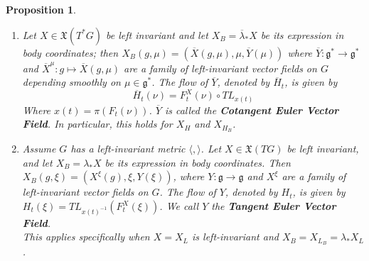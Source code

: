 \documentclass{article}
\newtheorem{prop}{Proposition}
\begin{document}
\begin{prop}

\begin{enumerate}
    \item Let $X \in \mathfrak{X}(T^*G)$ be left invariant and let $X_B = \overline{\lambda}_* X$ be its expression in body coordinates; then $X_B (g,\mu) = (\overline{X}(g,\mu), \mu, \overline{Y}(\mu))$ where $\overline{Y}: \mathfrak{g}^* \to \mathfrak{g}^*$ and $\overline{X}^{\mu}: g \mapsto \overline{X}(g,\mu)$ are a family of left-invariant vector fields on $G$ depending smoothly on $\mu \in \mathfrak{g}^*$. The flow of $\overline{Y}$, denoted by $\overline{H}_t$, is given by \begin{equation} \overline{H}_t(\nu) = F^X_t(\nu) \circ TL_{x(t)} \end{equation}
    Where $x(t) = \pi(F_t(\nu))$. $\overline{Y}$ is called the \textbf{Cotangent Euler Vector Field}. In particular, this holds for $X_H$ and $X_{H_B}$.
    
    \item Assume $G$ has a left-invariant metric $\langle , \rangle$. Let $X \in \mathfrak{X}(TG)$ be left invariant, and let $X_B=\lambda_* X$ be its expression in body coordinates. Then $X_B(g,\xi) = (X^{\xi}(g), \xi, Y(\xi))$, where $Y:\mathfrak{g} \to \mathfrak{g}$ and $X^{\xi}$ are a family of left-invariant vector fields on $G$. The flow of $Y$, denoted by $H_t$, is given by $H_t(\xi) = TL_{x(t)^{-1}}(F^X_t(\xi))$. We call $Y$ the \textbf{Tangent Euler Vector Field}.\\
    \indent This applies specifically when $X=X_L$ is left-invariant and $X_B = X_{L_B} = \lambda_* X_L$.
    \end{enumerate}
\end{prop}
\end{document}
